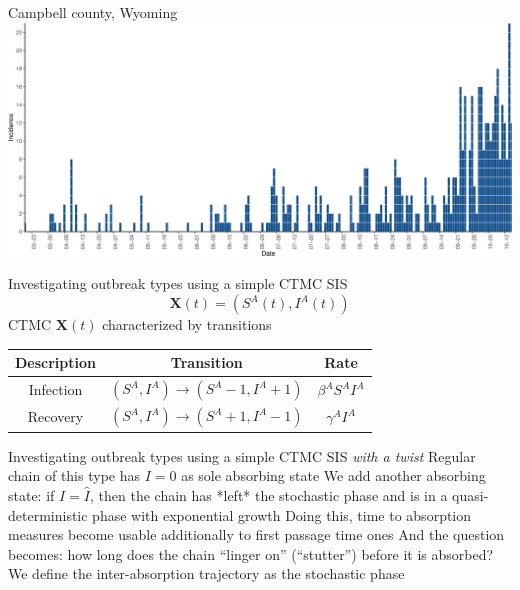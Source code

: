 \documentclass[aspectratio=169]{beamer}\usepackage[]{graphicx}\usepackage[]{xcolor}
\begin{document}
\begin{frame}{Campbell county, Wyoming}
	\centering
	\includegraphics[width=\textwidth]{FIGS/select_Wyoming-Campbell_bars_zoom.png}
\end{frame}

\begin{frame}{Investigating outbreak types using a simple CTMC SIS}
\[
\mathbf{X}(t)=\left(S^A(t),I^A(t)\right)
\]
\vfill
CTMC $\mathbf{X}(t)$ characterized by transitions
\begin{center}
	\begin{tabular}{ccc}
		\toprule
		Description & Transition & Rate \\
		\midrule
		Infection & $\left(S^A,I^A\right)\to \left(S^A-1,I^A+1\right)$ & $\beta^AS^AI^A$ \\
		Recovery & $\left(S^A,I^A\right)\to \left(S^A+1,I^A-1\right)$ & $\gamma^AI^A$ \\
		\bottomrule
	\end{tabular}
\end{center}
\end{frame}

\begin{frame}{Investigating outbreak types using a simple CTMC SIS \emph{with a twist}}
Regular chain of this type has $I=0$ as sole absorbing state
\vfill
We add another absorbing state: if $I=\hat I$, then the chain has *left* the stochastic phase and is in a quasi-deterministic phase with exponential growth
\vfill
Doing this, time to absorption measures become usable additionally to first passage time ones
\vfill
And the question becomes: how long does the chain ``linger on'' (``stutter'') before it is absorbed? We define the inter-absorption trajectory as the stochastic phase
\end{frame}

\end{document}
